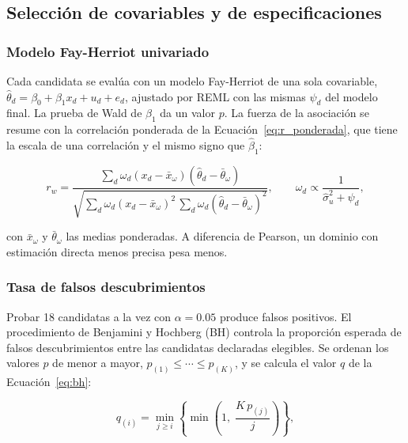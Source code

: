 \subsection{Selección de covariables y de especificaciones}
\label{subsec:seleccion}

\subsubsection{Modelo Fay-Herriot univariado}

Cada candidata se evalúa con un modelo Fay-Herriot de una sola covariable, $\hat{\theta}_d = \beta_0 + \beta_1 x_d + u_d + e_d$, ajustado por REML con las mismas $\psi_d$ del modelo final. La prueba de Wald de $\beta_1$ da un valor $p$. La fuerza de la asociación se resume con la correlación ponderada de la Ecuación~\ref{eq:r_ponderada}, que tiene la escala de una correlación y el mismo signo que $\hat{\beta}_1$:

\begin{equation}
    r_w = \frac{\sum_d \omega_d (x_d - \bar{x}_\omega)(\hat{\theta}_d - \bar{\theta}_\omega)}{\sqrt{\sum_d \omega_d (x_d-\bar{x}_\omega)^2\, \sum_d \omega_d (\hat{\theta}_d-\bar{\theta}_\omega)^2}}, \qquad \omega_d \propto \frac{1}{\hat{\sigma}_u^2 + \psi_d},
    \label{eq:r_ponderada}
\end{equation}

con $\bar{x}_\omega$ y $\bar{\theta}_\omega$ las medias ponderadas. A diferencia de Pearson, un dominio con estimación directa menos precisa pesa menos.

\subsubsection{Tasa de falsos descubrimientos}

Probar 18 candidatas a la vez con $\alpha = 0.05$ produce falsos positivos. El procedimiento de Benjamini y Hochberg (BH) \cite{BenjaminiHochberg1995} controla la proporción esperada de falsos descubrimientos entre las candidatas declaradas elegibles. Se ordenan los valores $p$ de menor a mayor, $p_{(1)} \leq \cdots \leq p_{(K)}$, y se calcula el valor $q$ de la Ecuación~\ref{eq:bh}:

\begin{equation}
    q_{(i)} = \min_{j \geq i}\left\{\min\!\left(1,\; \frac{K\, p_{(j)}}{j}\right)\right\},
    \label{eq:bh}
\end{equation}

